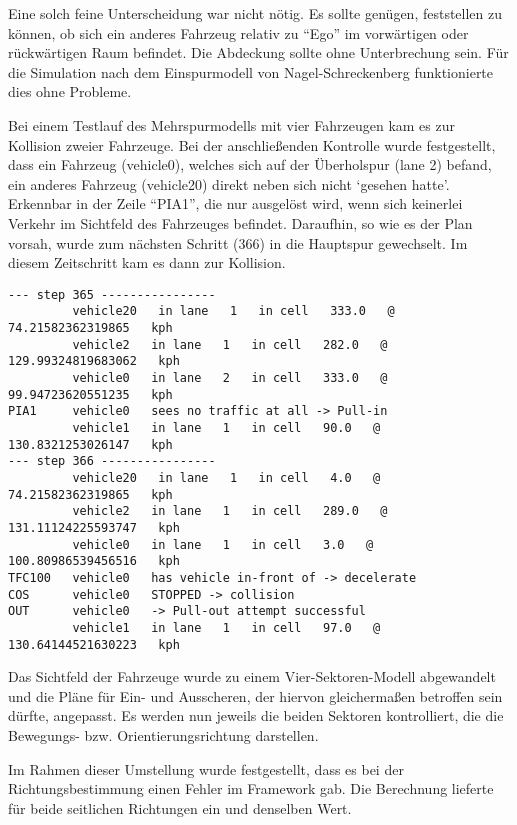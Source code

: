 Eine solch feine Unterscheidung war nicht nötig.
Es sollte genügen, feststellen zu können, ob sich ein anderes Fahrzeug relativ zu \enquote{Ego} im vorwärtigen oder rückwärtigen Raum befindet. 
Die Abdeckung sollte ohne Unterbrechung sein.
Für die Simulation nach dem Einspurmodell von Nagel-Schreckenberg funktionierte dies ohne Probleme.

Bei einem Testlauf des Mehrspurmodells mit vier Fahrzeugen kam es zur Kollision zweier Fahrzeuge. 
Bei der anschließenden Kontrolle wurde festgestellt, dass ein Fahrzeug (vehicle0), welches sich auf der Überholspur (lane 2) befand, ein anderes Fahrzeug (vehicle20) direkt neben sich nicht \enquote*{gesehen hatte}. 
Erkennbar in der Zeile \enquote{PIA1}, die nur ausgelöst wird, wenn sich keinerlei Verkehr im Sichtfeld des Fahrzeuges befindet.
Daraufhin, so wie es der Plan vorsah, wurde zum nächsten Schritt (366) in die Hauptspur gewechselt. 
Im diesem Zeitschritt kam es dann zur Kollision.

\begin{verbatim}
--- step 365 ----------------
         vehicle20   in lane   1   in cell   333.0   @   74.21582362319865   kph
         vehicle2   in lane   1   in cell   282.0   @   129.99324819683062   kph
         vehicle0   in lane   2   in cell   333.0   @   99.94723620551235   kph
PIA1     vehicle0   sees no traffic at all -> Pull-in
         vehicle1   in lane   1   in cell   90.0   @   130.8321253026147   kph
--- step 366 ----------------
         vehicle20   in lane   1   in cell   4.0   @   74.21582362319865   kph
         vehicle2   in lane   1   in cell   289.0   @   131.11124225593747   kph
         vehicle0   in lane   1   in cell   3.0   @   100.80986539456516   kph
TFC100   vehicle0   has vehicle in-front of -> decelerate
COS      vehicle0   STOPPED -> collision
OUT      vehicle0   -> Pull-out attempt successful
         vehicle1   in lane   1   in cell   97.0   @   130.64144521630223   kph
\end{verbatim}

Das Sichtfeld der Fahrzeuge wurde zu einem Vier-Sektoren-Modell abgewandelt und die Pläne für Ein- und Ausscheren, der hiervon gleichermaßen betroffen sein dürfte, angepasst.
Es werden nun jeweils die beiden Sektoren kontrolliert, die die Bewegungs- bzw. Orientierungsrichtung darstellen.

Im Rahmen dieser Umstellung wurde festgestellt, dass es bei der Richtungsbestimmung einen Fehler im Framework gab.
Die Berechnung lieferte für beide seitlichen Richtungen ein und denselben Wert.
